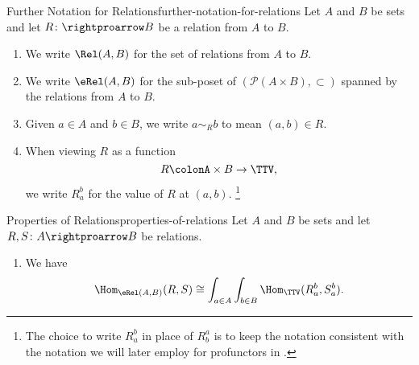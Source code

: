 \begin{notation}{Further Notation for Relations}{further-notation-for-relations}%
    Let $A$ and $B$ be sets and let $R\colon\rightproarrow B$ be a relation from $A$ to $B$.
    \begin{enumerate}
        \item\label{further-notation-for-relations-the-set-of-relations-between-two-sets}We write $\Rel(A,B)$ for the set of relations from $A$ to $B$.
        \item\label{further-notation-for-relations-the-poset-of-relations-between-two-sets}We write $\eRel(A,B)$ for the sub-poset of $(\mathcal{P}(A\times B),\subset)$ spanned by the relations from $A$ to $B$.
        \item\label{further-notation-for-relations-a-simr-b}Given $a\in A$ and $b\in B$, we write $a\sim_{R}b$ to mean $(a,b)\in R$.
        \item\label{further-notation-for-relations-r-b-a}When viewing $R$ as a function
            \[
                R%
                \colon%
                A\times B%
                \to%
                \TTV,%
            \]%
            we write $R^{b}_{a}$ for the value of $R$ at $(a,b)$.%
            \footnote{%
                The choice to write $R^{b}_{a}$ in place of $R^{a}_{b}$ is to keep the notation consistent with the notation we will later employ for profunctors in \ChapterProfunctors.
                \par\vspace*{\TCBBoxCorrection}
            }%
    \end{enumerate}
\end{notation}
\begin{proposition}{Properties of Relations}{properties-of-relations}%
    Let $A$ and $B$ be sets and let $R,S\colon A\rightproarrow B$ be relations.
    \begin{enumerate}
        \item\label{properties-of-relations-end-formula-for-the-set-of-inclusions-of-relations}We have
            \[
                \Hom_{\eRel(A,B)}(R,S)%
                \cong%
                \int_{a\in A}\int_{b\in B}\Hom_{\TTV}(R^{b}_{a},S^{b}_{a}).%
            \]%
    \end{enumerate}
\end{proposition}
